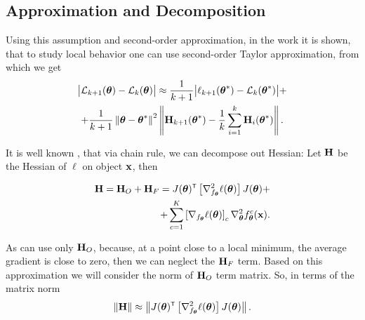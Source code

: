 \documentclass[conference]{IEEEtran}
\begin{document}
\subsection{Approximation and Decomposition} 
Using this assumption and second-order approximation, in the work \cite{kiselev2024unravelinghessiankeysmooth} it is shown, that to study local behavior one can use second-order Taylor approximation, from which we get
\begin{multline}\label{eq:diff}
\big|\cL_{k+1}(\btheta) - \cL_{k}(\btheta)\big| \approx \frac{1}{k+1}\big|\ell_{k+1}(\btheta^*) - \cL_k(\btheta^*)\big| + \\
 + \frac{1}{k+1}\norm{\btheta - \btheta^*}^2\norm{\bH_{k+1}(\btheta^*) - \frac{1}{k}\sum\limits_{i=1}^k\bH_i(\btheta^*)}.
\end{multline}


It is well known \cite{schraudolph2002}, that via chain rule, we can decompose out Hessian: 
Let $\mathbf{H}$ be the Hessian of $\ell$ on object $\mathbf{x}$, then

\begin{align*}
\bH = \bH_O + \bH_F = J(\btheta)\T\left[\nabla^2_{f_{\btheta}}\ell(\btheta)\right]J(\btheta) + \\
+ \sum\limits_{c = 1}^K\left[\nabla_{f_{\btheta}}\ell(\btheta)\right]_c\nabla^2_{\btheta}f^c_{\btheta}(\bx).
\end{align*}

As \cite{DBLP:journals/corr/SagunEGDB17, DBLP:journals/corr/abs-1910-05929} can use only $\mathbf{H}_O$, because, at a point close to a local minimum, the average gradient is close to zero, then we can neglect the $\mathbf{H}_F$ term. Based on this approximation we will consider the norm of $\mathbf{H}_O$ term matrix.
So, in terms of the matrix norm 
\begin{equation}
    \norm{\bH} \approx \norm{J(\btheta)\T\left[ \nabla^2_{f_{\btheta}} \ell (\btheta)\right] J(\btheta)}.
\end{equation}
\end{document}
